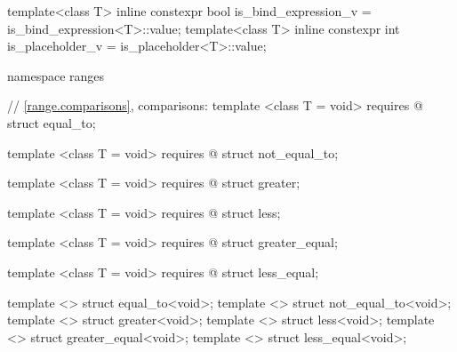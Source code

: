 \begin{codeblock}
  [...]

  template<class T>
    inline constexpr bool is_bind_expression_v = is_bind_expression<T>::value;
  template<class T>
    inline constexpr int is_placeholder_v = is_placeholder<T>::value;
\end{codeblock}
\begin{addedblock}
\begin{codeblock}

  namespace ranges {
    // \ref{range.comparisons}, comparisons:
    template <class T = void>
      requires @\seebelow@
    struct equal_to;

    template <class T = void>
      requires @\seebelow@
    struct not_equal_to;

    template <class T = void>
      requires @\seebelow@
    struct greater;

    template <class T = void>
      requires @\seebelow@
    struct less;

    template <class T = void>
      requires @\seebelow@
    struct greater_equal;

    template <class T = void>
      requires @\seebelow@
    struct less_equal;

    template <> struct equal_to<void>;
    template <> struct not_equal_to<void>;
    template <> struct greater<void>;
    template <> struct less<void>;
    template <> struct greater_equal<void>;
    template <> struct less_equal<void>;
  }
\end{codeblock}
\end{addedblock}
\begin{codeblock}
}
\end{codeblock}

